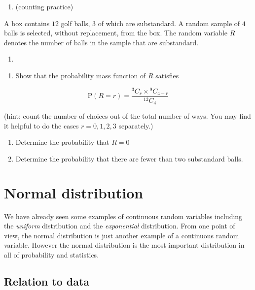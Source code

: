 \documentclass[
]{book}
\providecommand{\tightlist}{%
  \setlength{\itemsep}{0pt}\setlength{\parskip}{0pt}}
\theoremstyle{definition}
\theoremstyle{definition}
\theoremstyle{definition}
\theoremstyle{definition}
\theoremstyle{remark}
\begin{document}
\begin{enumerate}
\def\labelenumi{\arabic{enumi}.}
\setcounter{enumi}{2}
\tightlist
\item
  (counting practice)
\end{enumerate}

A box contains \(12\) golf balls, \(3\) of which are substandard. A random sample of \(4\) balls is selected, without replacement, from the box. The random variable \(R\) denotes the number of balls in the sample that are substandard.

\begin{enumerate}
\def\labelenumi{\alph{enumi})}
\item
\end{enumerate}

\begin{enumerate}
\def\labelenumi{(\roman{enumi})}
\tightlist
\item
  Show that the probability mass function of \(R\) satisfies
\end{enumerate}

\[\text{P}(R=r) = \frac{{}^3C_r \times {}^9C_{4-r}}{^{12}C_{4}}\]

(hint: count the number of choices out of the total number of ways. You may find it helpful to do the cases \(r=0,1,2,3\) separately.)

\begin{enumerate}
\def\labelenumi{(\roman{enumi})}
\setcounter{enumi}{1}
\item
  Determine the probability that \(R=0\)
\item
  Determine the probability that there are fewer than two substandard balls.
\end{enumerate}

\hypertarget{norm}{%
\chapter{Normal distribution}\label{norm}}

We have already seen some examples of continuous random variables including the \emph{uniform} distribution and the \emph{exponential} distribution. From one point of view, the normal distribution is just another example of a continuous random variable. However the normal distribution is the most important distribution in all of probability and statistics.

\hypertarget{relation-to-data}{%
\section{Relation to data}\label{relation-to-data}}
\end{document}
